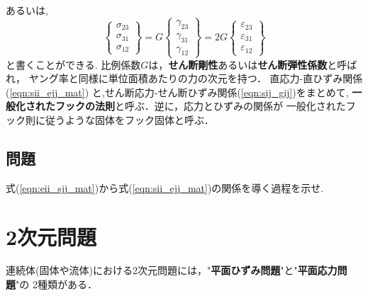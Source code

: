 \documentclass[10pt,a4j]{jbook}
\begin{document}
あるいは,
\begin{equation}
	\left\{ 
		\begin{array}{*{20}{c}}
		\sigma_{23}\\
		\sigma_{31}\\
		\sigma_{12}
		\end{array}
	\right\} 
	=
	G
	\left\{
		\begin{array}{*{20}{c}}
		\gamma_{23}\\
		\gamma_{31}\\
		\gamma_{12}
		\end{array}
	\right\}
	=
	2G
	\left\{
		\begin{array}{*{20}{c}}
		\varepsilon_{23}\\
		\varepsilon_{31}\\
		\varepsilon_{12}
		\end{array}
	\right\}
	\label{eqn:sij_gij}
\end{equation}
と書くことができる.
比例係数$G$は，{\bf せん断剛性}あるいは{\bf せん断弾性係数}と呼ばれ，
ヤング率と同様に単位面積あたりの力の次元を持つ．
直応力-直ひずみ関係(\ref{eqn:sii_ejj_mat})
と,せん断応力-せん断ひずみ関係(\ref{eqn:sij_gij})をまとめて,
{\bf 一般化されたフックの法則}と呼ぶ．逆に，応力とひずみの関係が
一般化されたフック則に従うような固体をフック固体と呼ぶ．
\subsection{問題}
式(\ref{eqn:eii_sjj_mat})から式(\ref{eqn:sii_ejj_mat})の関係を導く過程を示せ. 
\section{2次元問題}
連続体(固体や流体)における2次元問題には，"{\bf 平面ひずみ問題}"と"{\bf 平面応力問題}"の
2種類がある．
\end{document}
